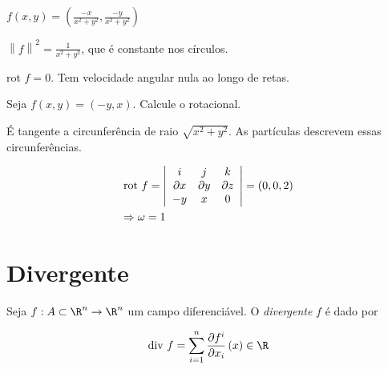 \documentclass[11pt, oneside, a4paper]{gsm-l}
\begin{document}
\newpage 

\begin{exem}
$\displaystyle f\left( {x,y} \right) = \left( {\frac{{ - x}}{{x^2  + y^2 }},\frac{{ - y}}{{x^2  + y^2 }}} \right)$
\end{exem}

\begin{sol}
$\left\| f \right\|^2  = \displaystyle \frac{1}{{x^2  + y^2 }}$, que é constante nos círculos.

rot $f = 0$. Tem velocidade angular nula ao longo de retas.
\end{sol}

\begin{exem}
Seja $f\left( {x,y} \right) = \left( { - y,x} \right)$. Calcule o rotacional.
\end{exem}

\begin{sol}
É tangente a circunfer\^encia de raio $\sqrt {x^2  + y^2 }$. As partículas descrevem essas circunfer\^encias.


\[
\begin{gathered}
  {\text{rot }}f = \left| {\begin{array}{*{20}c}
   i & j & k  \\
   {\partial x} & {\partial y} & {\partial z}  \\
   { - y} & x & 0  \\

 \end{array} } \right| = \left( {0,0,2} \right) \hfill \\
   \Rightarrow \omega  = 1 \hfill \\
\end{gathered}
\]

\end{sol}

\section{Divergente} \label{sec26}

\begin{defi}
Seja $f:A \subset \R^n  \to \R^n$ um campo diferenciável. O \textit{divergente} $f$ é dado por

\[
{\text{div }}f = \sum\limits_{i = 1}^n {\frac{{\partial f^i }}
{{\partial x_i }}\left( x \right)}  \in \R
\]

\end{defi}
\end{document}
